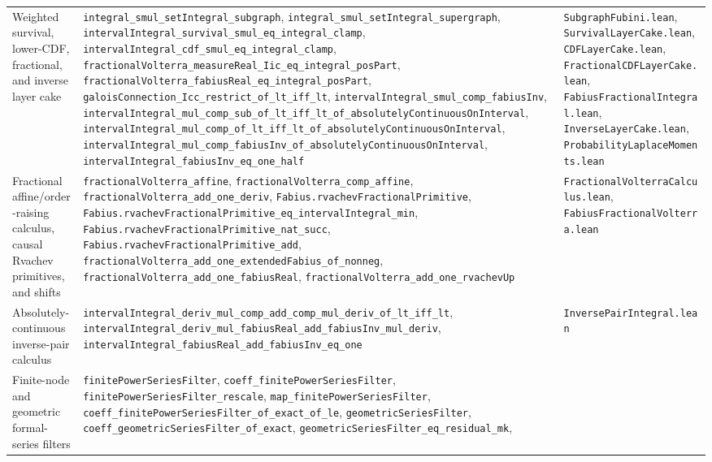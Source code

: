 \documentclass[11pt,oneside]{article}
\theoremstyle{definition}
\theoremstyle{remark}
\begin{document}
\begin{longtable}{@{}p{}p{}p{}@{}}
Weighted survival, lower-CDF, fractional, and inverse layer cake &
\nolinkurl{integral_smul_setIntegral_subgraph},
\nolinkurl{integral_smul_setIntegral_supergraph},
\nolinkurl{intervalIntegral_survival_smul_eq_integral_clamp},
\nolinkurl{intervalIntegral_cdf_smul_eq_integral_clamp},
\nolinkurl{fractionalVolterra_measureReal_Iic_eq_integral_posPart},
\nolinkurl{fractionalVolterra_fabiusReal_eq_integral_posPart},
\nolinkurl{galoisConnection_Icc_restrict_of_lt_iff_lt},
\nolinkurl{intervalIntegral_smul_comp_fabiusInv},
\nolinkurl{intervalIntegral_mul_comp_sub_of_lt_iff_lt_of_absolutelyContinuousOnInterval},
\nolinkurl{intervalIntegral_mul_comp_of_lt_iff_lt_of_absolutelyContinuousOnInterval},
\nolinkurl{intervalIntegral_mul_comp_fabiusInv_of_absolutelyContinuousOnInterval},
\nolinkurl{intervalIntegral_fabiusInv_eq_one_half} &
\nolinkurl{SubgraphFubini.lean}, \nolinkurl{SurvivalLayerCake.lean},
\nolinkurl{CDFLayerCake.lean}, \nolinkurl{FractionalCDFLayerCake.lean},
\nolinkurl{FabiusFractionalIntegral.lean},
\nolinkurl{InverseLayerCake.lean}, \nolinkurl{ProbabilityLaplaceMoments.lean} \\
Fractional affine/order-raising calculus, causal Rvachev primitives, and shifts &
\nolinkurl{fractionalVolterra_affine},
\nolinkurl{fractionalVolterra_comp_affine},
\nolinkurl{fractionalVolterra_add_one_deriv},
\nolinkurl{Fabius.rvachevFractionalPrimitive},
\nolinkurl{Fabius.rvachevFractionalPrimitive_eq_intervalIntegral_min},
\nolinkurl{Fabius.rvachevFractionalPrimitive_nat_succ},
\nolinkurl{Fabius.rvachevFractionalPrimitive_add},
\nolinkurl{fractionalVolterra_add_one_extendedFabius_of_nonneg},
\nolinkurl{fractionalVolterra_add_one_fabiusReal},
\nolinkurl{fractionalVolterra_add_one_rvachevUp} &
\nolinkurl{FractionalVolterraCalculus.lean},
\nolinkurl{FabiusFractionalVolterra.lean} \\
Absolutely-continuous inverse-pair calculus &
\nolinkurl{intervalIntegral_deriv_mul_comp_add_comp_mul_deriv_of_lt_iff_lt},
\nolinkurl{intervalIntegral_deriv_mul_fabiusReal_add_fabiusInv_mul_deriv},
\nolinkurl{intervalIntegral_fabiusReal_add_fabiusInv_eq_one} &
\nolinkurl{InversePairIntegral.lean} \\
Finite-node and geometric formal-series filters &
\nolinkurl{finitePowerSeriesFilter},
\nolinkurl{coeff_finitePowerSeriesFilter},
\nolinkurl{finitePowerSeriesFilter_rescale},
\nolinkurl{map_finitePowerSeriesFilter},
\nolinkurl{coeff_finitePowerSeriesFilter_of_exact_of_le},
\nolinkurl{geometricSeriesFilter},
\nolinkurl{coeff_geometricSeriesFilter_of_exact},
\nolinkurl{geometricSeriesFilter_eq_residual_mk},

\end{longtable}
\end{document}
